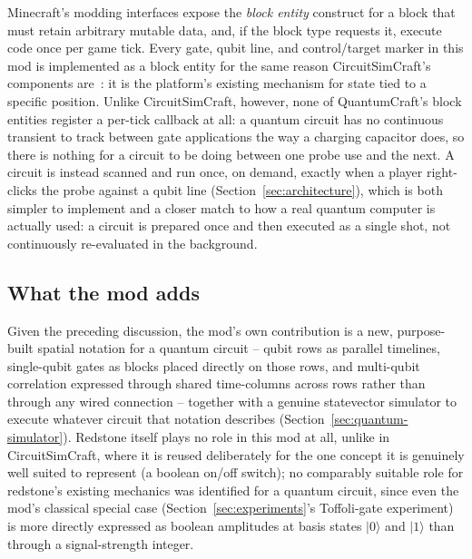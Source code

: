 Minecraft's modding interfaces expose the \emph{block entity} construct for a block that must
retain arbitrary mutable data, and, if the block type requests it, execute code once per game
tick. Every gate, qubit line, and control/target marker in this mod is implemented as a block
entity for the same reason CircuitSimCraft's components are~\cite{picos2026circuitsimcraft}: it is
the platform's existing mechanism for state tied to a specific position. Unlike
CircuitSimCraft, however, none of QuantumCraft's block entities register a per-tick callback at
all: a quantum circuit has no continuous transient to track between gate applications the way
a charging capacitor does, so there is nothing for a circuit to be doing between one probe use
and the next. A circuit is instead scanned and run once, on demand, exactly when a player
right-clicks the probe against a qubit line (Section~\ref{sec:architecture}), which is both
simpler to implement and a closer match to how a real quantum computer is actually used: a
circuit is prepared once and then executed as a single shot, not continuously re-evaluated in
the background.

\subsection{What the mod adds}

Given the preceding discussion, the mod's own contribution is a new, purpose-built spatial
notation for a quantum circuit -- qubit rows as parallel timelines, single-qubit gates as
blocks placed directly on those rows, and multi-qubit correlation expressed through shared
time-columns across rows rather than through any wired connection -- together with a
genuine statevector simulator to execute whatever circuit that notation describes
(Section~\ref{sec:quantum-simulator}). Redstone itself plays no role in this mod at all,
unlike in CircuitSimCraft, where it is reused deliberately for the one concept it is genuinely
well suited to represent (a boolean on/off switch); no comparably suitable role for redstone's
existing mechanics was identified for a quantum circuit, since even the mod's classical
special case (Section~\ref{sec:experiments}'s Toffoli-gate experiment) is more directly
expressed as boolean amplitudes at basis states $|0\rangle$ and $|1\rangle$ than through a
signal-strength integer.
